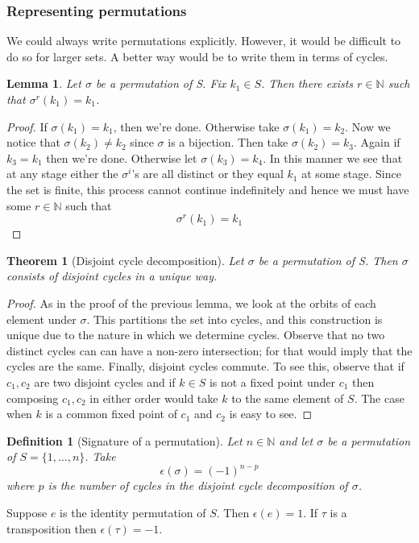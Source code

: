 \documentclass{article}
\newtheorem{theorem}{Theorem}
\newtheorem{definition}{Definition}
\newtheorem{lemma}{Lemma}
\begin{document}
\subsubsection{Representing permutations}
We could always write permutations explicitly. However, it would be difficult to do so for larger sets. A better way would be to write them in terms of cycles.
\begin{lemma}
Let $\sigma$ be a permutation of S. Fix $k_1\in S$. Then there exists $r\in\mathbb{N}$ such that $\sigma^{r}(k_1)=k_1$.
\end{lemma}
\begin{proof}
If $\sigma(k_1)=k_1$, then we're done. Otherwise take $\sigma(k_1)=k_2$. Now we notice that $\sigma(k_2)\neq k_2$ since $\sigma$ is a bijection. Then take $\sigma(k_2)=k_3$. Again if $k_3=k_1$ then we're done. Otherwise let $\sigma(k_3)=k_4$. In this manner we see that at any stage either the $\sigma^{i}$'s are all distinct or they equal $k_1$ at some stage. Since the set is finite, this process cannot continue indefinitely and hence we must have some $r\in\mathbb{N}$ such that $$\sigma^{r}(k_1)=k_1$$
\end{proof}
\begin{theorem}[Disjoint cycle decomposition]
    Let $\sigma$ be a permutation of S. Then $\sigma$ consists of disjoint cycles in a unique way. 
\end{theorem}
\begin{proof}
As in the proof of the previous lemma, we look at the orbits of each element under $\sigma$. This partitions the set into cycles, and this construction is unique due to the nature in which we determine cycles. Observe that no two distinct cycles can can have a non-zero intersection; for that would imply that the cycles are the same. 
Finally, disjoint cycles commute. To see this, observe that if $c_1,c_2$ are two disjoint cycles and if $k\in S$ is not a fixed point under $c_1$ then composing $c_1,c_2$ in either order would take $k$ to the same element of $S$. The case when $k$ is a common fixed point of $c_1$ and $c_2$ is easy to see.
\end{proof}
\begin{definition}[Signature of a permutation]
    Let $n\in\mathbb{N}$ and let $\sigma$ be a permutation of $S=\{1,\dots,n\}$. Take $$\epsilon(\sigma)=(-1)^{n-p}$$
where $p$ is the number of cycles in the disjoint cycle decomposition of $\sigma$.
\end{definition}
Suppose $e$ is the identity permutation of $S$. Then $\epsilon(e)=1$. If $\tau$ is a transposition then $\epsilon(\tau)=-1$.\\
\end{document}
